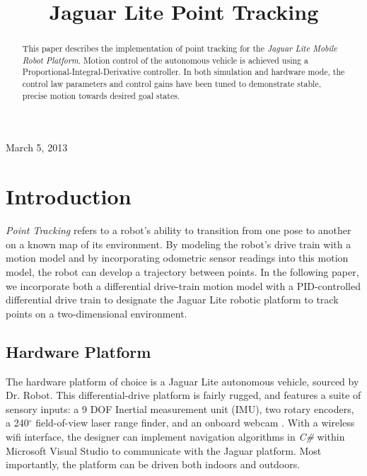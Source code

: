 \documentclass[conference]{IEEEtran}
\begin{document}
%
\title{Jaguar Lite Point Tracking}

\author{
\and
{}
}

\maketitle
{\flushleft March 5, 2013}\\
\IEEEpeerreviewmaketitle

\begin{abstract}
This paper describes the implementation of point tracking for the \emph{Jaguar Lite Mobile Robot Platform}. Motion control of the autonomous vehicle is achieved using a Proportional-Integral-Derivative controller. In both simulation and hardware mode, the control law parameters and control gains have been tuned to demonstrate stable, precise motion towards desired goal states.
\end{abstract} 

\section{Introduction}
\emph{Point Tracking} refers to a robot's ability to transition 
from one pose to another on a known map of its environment. By modeling the 
robot's drive train with a motion model and by incorporating odometric 
sensor readings into this motion model, the robot can develop a trajectory 
between points.  In the following paper, we incorporate both a differential drive-train 
motion model with a PID-controlled differential drive train to designate the
Jaguar Lite robotic platform to track points on a two-dimensional environment.

\subsection{Hardware Platform}
The hardware platform of choice is a Jaguar Lite autonomous vehicle, sourced 
by Dr. Robot.  This differential-drive platform is fairly rugged, and 
features a suite of sensory inputs: a 9 DOF Inertial measurement unit (IMU), 
two rotary encoders, a 240$^{\circ}$ field-of-view laser range finder, and an
onboard webcam \cite{Dr.RobotWebsite}.  With a wireless wifi interface, the 
designer can implement navigation algorithms in \emph{C\#} within Microsoft Visual Studio to communicate with the Jaguar platform. Most importantly, the platform can  be driven both 
indoors and outdoors. 
\end{document}
